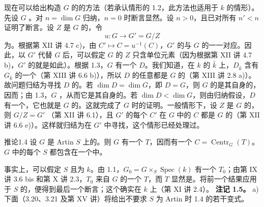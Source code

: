 现在可以给出构造 $G$ 的的方法（若承认情形的 1.2，此方法也适用于 $k$ 的情形）。先设 $G$ 。对 $n=\dim G$ 归纳，$n=0$ 时断言显然。设 $n>0$，且已对所有 $n'<n$ 证明了断言。设 $Z$ 是 $G$ 的，令
\[u:G\longrightarrow G'=G/Z\]
为。根据第 XII 讲 4.7 c)，由 $C'\mapsto C=u^{-1}(C)$，$G'$ 的与 $G$ 的一一对应。因此，以 $G'$ 代替 $G$ 后，可以假定 $G$ 的 $Z$ 只含单位元素（因为根据第 XII 讲 4.7 b)，$G'$ 的就是如此）。根据 1.3，$G$ 有一个 $D$。我们知道，在 $k$ 的 $\bar k$ 上，$D_{\bar k}$ 含有 $G_{\bar k}$ 的一个（第 XIII 讲 6.6 b)），所以 $D$ 的任意都是 $G$ 的（第 XIII 讲 2.8 a)）。故问题归结为寻找 $D$ 的。若 $\dim D=\dim G$，即 $D=G$，则 $G$ 的是其自身的，因而；由 1.3，$G$ ，从而它是其自身的。若 $\dim D<\dim G$，则由归纳假设，$D$ 有一个，它也就是 $G$ 的。这就完成了 $G$ 时的证明。一般情形下，设 $Z$ 是 $G$ 的，则 $G/Z=G'$ （第 XII 讲 6.1），且 $G'$ 的每个 $C'$ 在 $G$ 中的 $C$ 都是 $G$ 的（第 XII 讲 6.6 e)）。这样就归结为在 $G'$ 中寻找，这个情形已经处理过。
\begin{SGAresult}{推论}{1.4}
设 $G$ 是 Artin  $S$ 上的。则 $G$ 有一个 $T$，因而有一个 $C=\operatorname{Centr}_G(T)$。$G$ 中的每个 $S$ 都包含在一个中。
\end{SGAresult}
事实上，可以假定 $S$ 且为 $k$。由 1.1，$G_0=G\times_S\operatorname{Spec}(k)$ 有一个 $T_0$；由第 IX 讲 3.6 bis 和第 X 讲 2.3，$T_0$ 来自 $G$ 的一个 $T$，而 $T$ 显然是。将前一个结果应用于 $S$ 的，便得到最后一个断言；这个确实在 $k$ 上（第 XI 讲 2.4）。
\textbf{注记 1.5。} a) 下面（3.20、3.21 及第 XV 讲）将给出不要求 $S$ 为 Artin 时 1.4 的若干变式。


